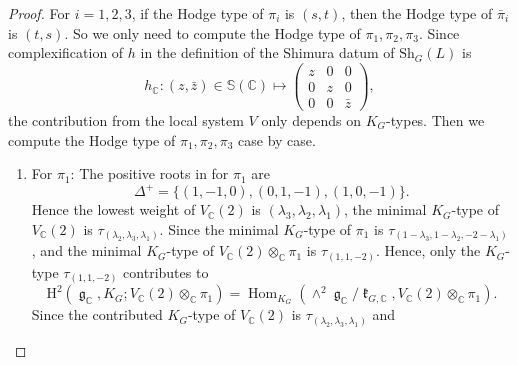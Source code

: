 \documentclass[11pt, a4paper]{amsart}
\theoremstyle{plain}
\theoremstyle{definition}
\numberwithin{equation}{section}
\def\CC{\mathbb{C}}
\DeclareMathOperator{\Hom}{Hom}
\DeclareMathOperator{\lieg}{\mathfrak g}
\DeclareMathOperator{\liek}{\mathfrak k}
\newcommand{\Sh}{\mathrm{Sh}}
\begin{document}
\begin{proof}
    For $i = 1,2,3$, if the Hodge type of $\pi_{i}$ is $(s, t)$, then the Hodge type of $\bar{\pi}_i$ is $(t, s)$. So we only need to compute the Hodge type of $\pi_1, \pi_2, \pi_3$. 
    Since complexification of $h$ in the definition of the Shimura datum of $\Sh_{G}(L)$ is 
    \begin{equation*}
        h_{\CC}\colon (z, \bar{z}) \in \mathbb{S}(\CC) \mapsto \begin{pmatrix}
                                                    z & 0 & 0 \\
                                                    0 & z & 0 \\
                                                    0 & 0 & \bar{z} 
                                                \end{pmatrix}, 
    \end{equation*}
    the contribution from the local system $V$ only depends on $K_{G}$-types. Then we compute the Hodge type of $\pi_1, \pi_2, \pi_3$ case by case. 
    \begin{enumerate}
        \item For $\pi_1$: The positive roots in \cite[Theorem 9.20]{Knapp86} for $\pi_1$ are 
                           \begin{equation*}
                                \Delta^{+} = \{(1, -1, 0), (0, 1, -1), (1, 0, -1) \}. 
                           \end{equation*}
                           Hence the lowest weight of $V_{\CC}(2)$ is $(\lambda_3, \lambda_2, \lambda_1)$, the minimal $K_{G}$-type of $V_{\CC}(2)$ is $\tau_{(\lambda_2, \lambda_3, \lambda_1)}$. 
                           Since the minimal $K_{G}$-type of $\pi_1$ is $\tau_{(1 - \lambda_3, 1 - \lambda_2, -2 - \lambda_1)}$, and the minimal $K_{G}$-type of 
                           $V_{\CC}(2) \otimes_{\CC} \pi_1$ is $\tau_{(1, 1, -2)}$. Hence, only the $K_{G}$-type $\tau_{(1, 1, -2)}$ contributes to 
                           \begin{equation*}
                               \mathrm{H}^{2}(\lieg_{\CC}, K_{G}; V_{\CC}(2) \otimes_{\CC} \pi_{1}) = \Hom_{K_G}(\wedge^{2} \lieg_{\CC} / \liek_{G, \CC}, V_{\CC}(2) \otimes_{\CC} \pi_{1}). 
                           \end{equation*}
                           Since the contributed $K_{G}$-type of $V_{\CC}(2)$ is $\tau_{(\lambda_2, \lambda_3, \lambda_1)}$ and 
                           \begin{equation*}

\end{equation*}
\end{enumerate}
\end{proof}
\end{document}
